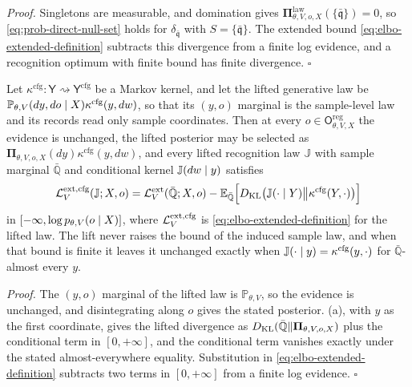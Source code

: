 \noindent\emph{Proof.}
Singletons are measurable, and domination gives
$\boldsymbol\Pi^{\mathrm{law}}_{\theta,V,o,X}(\{\bar{\mathfrak q}\})=0$, so \eqref{eq:prob-direct-null-set} holds for
$\delta_{\bar{\mathfrak q}}$ with $S=\{\bar{\mathfrak q}\}$. The extended bound
\eqref{eq:elbo-extended-definition} subtracts this divergence from a finite log evidence, and a recognition
optimum with finite bound has finite divergence. \hfill$\square$

Let $\kappa^{\mathrm{cfg}}:\mathsf Y\rightsquigarrow\mathsf Y^{\mathrm{cfg}}$ be a Markov kernel, and let the lifted
generative law be $\mathbb P_{\theta,V}(dy,do\mid X)\kappa^{\mathrm{cfg}}(y,dw)$, so that its
$(y,o)$ marginal is the sample-level law and its records read only sample coordinates. Then at every
$o\in\mathsf O^{\mathrm{reg}}_{\theta,V,X}$ the evidence is unchanged, the lifted posterior may be selected
as $\boldsymbol\Pi_{\theta,V,o,X}(dy)\kappa^{\mathrm{cfg}}(y,dw)$, and every lifted recognition law $\mathbb J$
with sample marginal $\bar{\mathbb Q}$ and conditional kernel $\mathbb J(dw\mid y)$ satisfies
\begin{equation}
\mathcal L^{\mathrm{ext,cfg}}_V(\mathbb J;X,o)
=\mathcal L^{\mathrm{ext}}_V(\bar{\mathbb Q};X,o)
-\mathbb E_{\bar{\mathbb Q}}\Bigl[D_{\mathrm{KL}}\bigl(\mathbb J(\cdot\mid Y)\big\Vert\kappa^{\mathrm{cfg}}(Y,\cdot)\bigr)\Bigr]
\label{eq:prob-configuration-lift-identity}
\end{equation}
in $[-\infty,\log p_{\theta,V}(o\mid X)]$, where $\mathcal L^{\mathrm{ext,cfg}}_V$ is
\eqref{eq:elbo-extended-definition} for the lifted law. The lift never raises the bound of the induced
sample law, and when that bound is finite it leaves it unchanged exactly when
$\mathbb J(\cdot\mid y)=\kappa^{\mathrm{cfg}}(y,\cdot)$ for $\bar{\mathbb Q}$-almost every $y$.

\noindent\emph{Proof.}
The $(y,o)$ marginal of the lifted law is $\mathbb P_{\theta,V}$, so the evidence is unchanged, and
disintegrating along $o$ gives the stated posterior. (a), with $y$ as the
first coordinate, gives the lifted divergence as $D_{\mathrm{KL}}(\bar{\mathbb Q}\Vert\boldsymbol\Pi_{\theta,V,o,X})$ plus
the conditional term in $[0,+\infty]$, and the conditional term vanishes exactly under the stated
almost-everywhere equality. Substitution in
\eqref{eq:elbo-extended-definition} subtracts two terms in $[0,+\infty]$ from a finite log evidence.
\hfill$\square$

